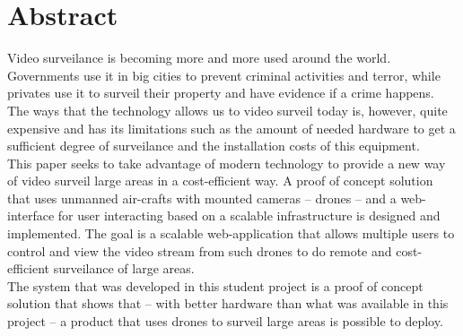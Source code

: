 \begingroup
\let\clearpage\relax
\let\cleardoublepage\relax
\let\cleardoublepage\relax

\chapter*{Abstract}
Video surveilance is becoming more and more used around the world.
Governments use it in big cities to prevent criminal activities and terror, while privates use it to surveil their property and have evidence if a crime happens.
The ways that the technology allows us to video surveil today is, however, quite expensive and has its limitations such as the amount of needed hardware to get a sufficient degree of surveilance and the installation costs of this equipment. \\

This paper seeks to take advantage of modern technology to provide a new way of video surveil large areas in a cost-efficient way. 
A proof of concept solution that uses unmanned air-crafts with mounted cameras -- drones -- and a web-interface for user interacting based on a scalable infrastructure is designed and implemented.
The goal is a scalable web-application that allows multiple users to control and view the video stream from such drones to do remote and cost-efficient surveilance of large areas. \\

The system that was developed in this student project is a proof of concept solution that shows that -- with better hardware than what was available in this project -- a product that uses drones to surveil large areas is possible to deploy. 

\endgroup			

\vfill